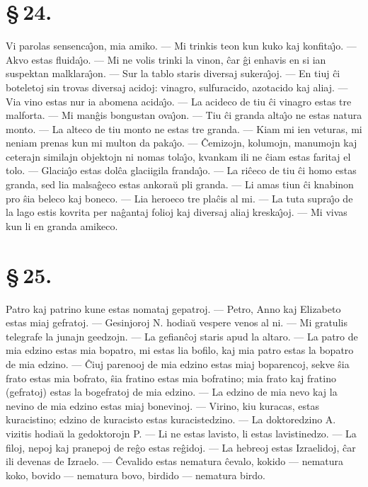 \enlargethispage{-\baselineskip}
\section*{\S\,24.}
Vi parolas sensenca\^{\j}on, mia amiko. --- Mi trinkis teon kun kuko
kaj konfita\^{\j}o. --- Akvo estas fluida\^{\j}o. --- Mi ne volis
trinki la vinon, \^car \^gi enhavis en si ian suspektan
malklara\^{\j}on. --- Sur la tablo staris diversaj sukera\^{\j}oj.
--- En tiuj \^ci boteletoj sin trovas diversaj acidoj: vinagro,
sulfuracido, azotacido kaj aliaj. --- Via vino estas nur ia abomena
acida\^{\j}o. --- La acideco de tiu \^ci vinagro estas tre malforta.
--- Mi man\^gis bongustan ova\^{\j}on. --- Tiu \^ci granda alta\^{\j}o
ne estas natura monto. --- La alteco de tiu monto ne estas tre
granda. --- Kiam mi ien veturas, mi neniam prenas kun mi multon da
paka\^{\j}o. --- \^Cemizojn, kolumojn, manumojn kaj ceterajn
similajn objektojn ni nomas tola\^{\j}o, kvankam ili ne \^ciam estas
faritaj el tolo. --- Glacia\^{\j}o estas dol\^ca glaciigila
franda\^{\j}o. --- La ri\^ceco de tiu \^ci homo estas granda, sed
lia malsa\^geco estas ankora\u u pli granda. --- Li amas tiun \^ci
knabinon pro \^sia beleco kaj boneco. --- Lia heroeco tre pla\^cis
al mi. --- La tuta supra\^{\j}o de la lago estis kovrita per
na\^gantaj folioj kaj diversaj aliaj kreska\^{\j}oj. --- Mi vivas
kun li en granda amikeco.


\section*{\S\,25.}
Patro kaj patrino kune estas nomataj gepatroj. --- Petro, Anno kaj
Elizabeto estas miaj gefratoj. --- Gesinjoroj N. hodia\u u vespere
venos al ni. --- Mi gratulis telegrafe la junajn geedzojn. --- La
gefian\^coj staris apud la altaro. --- La patro de mia edzino estas
mia bopatro, mi estas lia bofilo, kaj mia patro estas la bopatro de
mia edzino. --- \^Ciuj parenooj de mia edzino estas miaj boparencoj,
sekve \^sia frato estas mia bofrato, \^sia fratino estas mia
bofratino; mia frato kaj fratino (gefratoj) estas la bogefratoj de
mia edzino. --- La edzino de mia nevo kaj la nevino de mia edzino
estas miaj bonevinoj. --- Virino, kiu kuracas, estas kuracistino;
edzino de kuracisto estas kuracistedzino. --- La doktoredzino A.
vizitis hodia\u u la gedoktorojn P. --- Li ne estas lavisto, li
estas lavistinedzo. --- La filoj, nepoj kaj pranepoj de re\^go estas
re\^gidoj. --- La hebreoj estas Izraelidoj, \^car ili devenas de
Izraelo. --- \^Cevalido estas nematura \^cevalo, kokido --- nematura
koko, bovido --- nematura bovo, birdido --- nematura birdo.


